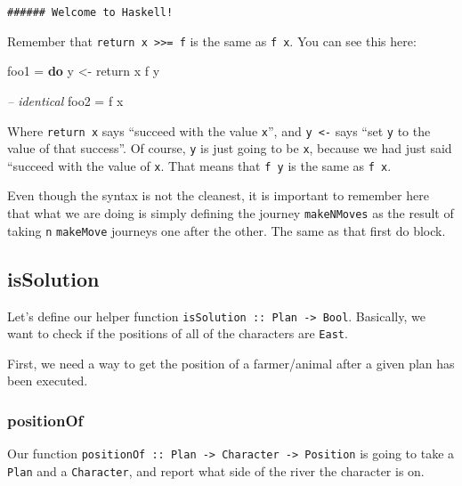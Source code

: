 \documentclass[]{article}
\newenvironment{Shaded}{}{}
\newcommand{\KeywordTok}[1]{\textcolor[rgb]{0.00,0.44,0.13}{\textbf{{#1}}}}
\newcommand{\CommentTok}[1]{\textcolor[rgb]{0.38,0.63,0.69}{\textit{{#1}}}}
\newcommand{\OtherTok}[1]{\textcolor[rgb]{0.00,0.44,0.13}{{#1}}}
\newcommand{\FunctionTok}[1]{\textcolor[rgb]{0.02,0.16,0.49}{{#1}}}
\newcommand{\NormalTok}[1]{{#1}}
\begin{document}
\begin{verbatim}
###### Welcome to Haskell!
\end{verbatim}

Remember that \texttt{return\ x\ \textgreater{}\textgreater{}=\ f} is the same
as \texttt{f\ x}. You can see this here:

\begin{Shaded}
\begin{Highlighting}[]
\NormalTok{foo1 }\FunctionTok{=} \KeywordTok{do}
    \NormalTok{y }\OtherTok{<-} \NormalTok{return x}
    \NormalTok{f y}

\CommentTok{-- identical}
\NormalTok{foo2 }\FunctionTok{=} \NormalTok{f x}
\end{Highlighting}
\end{Shaded}

Where \texttt{return\ x} says ``succeed with the value \texttt{x}'', and
\texttt{y\ \textless{}-} says ``set \texttt{y} to the value of that success''.
Of course, \texttt{y} is just going to be \texttt{x}, because we had just said
``succeed with the value of \texttt{x}. That means that \texttt{f\ y} is the
same as \texttt{f\ x}.

Even though the syntax is not the cleanest, it is important to remember here
that what we are doing is simply defining the journey \texttt{makeNMoves} as the
result of taking \texttt{n} \texttt{makeMove} journeys one after the other. The
same as that first do block.

\subsection{isSolution}\label{issolution}

Let's define our helper function
\texttt{isSolution\ ::\ Plan\ -\textgreater{}\ Bool}. Basically, we want to
check if the positions of all of the characters are \texttt{East}.

First, we need a way to get the position of a farmer/animal after a given plan
has been executed.

\subsubsection{positionOf}\label{positionof}

Our function
\texttt{positionOf\ ::\ Plan\ -\textgreater{}\ Character\ -\textgreater{}\ Position}
is going to take a \texttt{Plan} and a \texttt{Character}, and report what side
of the river the character is on.
\end{document}
